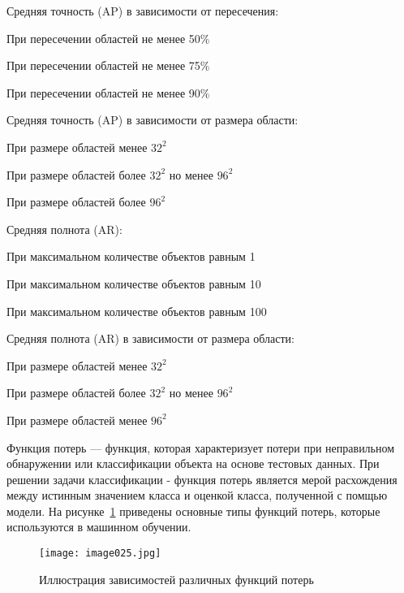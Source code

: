 %
\begin{itemize*}
  \item Средняя точность (AP) в зависимости от пересечения:
	\begin{itemize*}
	  \item При пересечении областей не менее 50\%
	  \item При пересечении областей не менее 75\%
	  \item При пересечении областей не менее 90\%	  
	\end{itemize*}
  \item Средняя точность (AP) в зависимости от размера области:
	\begin{itemize*}
	  \item При размере областей менее \(32^2\)
	  \item При размере областей более \(32^2\) но менее \(96^2\)
	  \item При размере областей более \(96^2\)
	\end{itemize*}
  \item Средняя полнота (AR):
	\begin{itemize*}
	  \item При максимальном количестве объектов равным 1
	  \item При максимальном количестве объектов равным 10
	  \item При максимальном количестве объектов равным 100
	\end{itemize*}
  \item Средняя полнота (AR) в зависимости от размера области:
	\begin{itemize*}
	  \item При размере областей менее \(32^2\)
	  \item При размере областей более \(32^2\) но менее \(96^2\)
	  \item При размере областей менее \(96^2\)
	\end{itemize*}
\end{itemize*}
%

Функция потерь — функция, которая характеризует потери при неправильном обнаружении или классификации объекта на основе тестовых данных. При решении задачи классификации - функция потерь является мерой расхождения между истинным значением класса и оценкой класса, полученной с помщью модели.
На рисунке~\ref{fig:lossfunctions}  приведены основные типы функций потерь, которые используются в машинном обучении.

\begin{figure}[htbp]
\centering
\texttt{[image: image025.jpg]}
\caption{Иллюстрация зависимостей различных функций потерь\cite{twentyone}}%
\label{fig:lossfunctions}
\end{figure}

